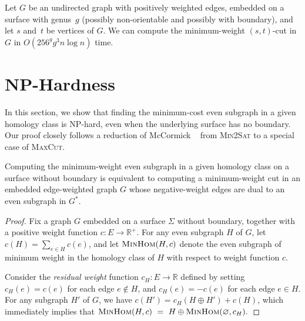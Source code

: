 \documentclass[letterpaper,review]{siamart190516}
\def\Real{\mathbb{R}}
\def\anote#1{\color{purple}Amir: #1 \color{black}}
\def\jnote#1{\textcolor{orange}{Jeff: #1}}
\begin{document}
{%
\begin{corollary}
\label{cor:mincut}
Let $G$ be an undirected graph with positively weighted edges, embedded on a surface with genus~$g$ (possibly non-orientable and possibly with boundary), and let $s$ and~$t$ be vertices of $G$.
We can compute the minimum-weight $(s,t)$-cut in $G$ in $O(256^g g^3 n \log n)$ time.
\end{corollary}


\section{{NP}-Hardness}
\label{S:NPhard}

In this section, we show that finding the minimum-cost even subgraph in a given homology class is {NP}-hard, even when the underlying surface has no boundary.  Our proof closely follows a reduction of McCormick \etal~\cite{mrr-edofm-03} from \textsc{Min2Sat} to a special case of \textsc{MaxCut}.

\begin{theorem}
Computing the minimum-weight even subgraph in a given homology class on a surface without boundary is equivalent to computing a minimum-weight cut in an embedded edge-weighted graph $G$ whose negative-weight edges are dual to an even subgraph in $G^*$.
\end{theorem}

\begin{proof}
Fix a graph $G$ embedded on a surface $\Sigma$ without boundary, together with a positive weight function $c\colon E\to \Real^+$.  For any even subgraph $H$ of $G$, let $c(H) = \sum_{e\in H} c(e)$, and let $\textsc{MinHom}(H,c)$ denote the even subgraph of minimum weight in the homology class of $H$ with respect to weight function $c$.

Consider the \emph{residual weight} function $c_H\colon E\to \Real$ defined by setting $c_H(e) = c(e)$ for each edge $e\not\in H$, and $c_H(e) = -c(e)$ for each edge $e\in H$.  For any subgraph $H'$ of $G$, we have $c(H') = c_H(H\oplus H') + c(H)$, which immediately implies that
\(
    \textsc{MinHom}(H,c) ~=~
    H \oplus \textsc{MinHom}(\varnothing, c_H).
\)



\end{proof}}
\end{document}

